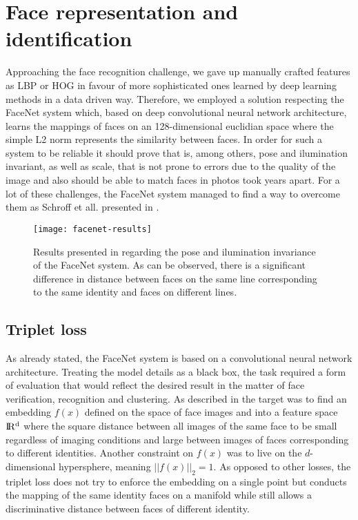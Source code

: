 \section{Face representation and identification}
Approaching the face recognition challenge, we gave up manually crafted features as LBP or HOG in favour of more sophisticated ones learned by deep learning methods in a data driven way. Therefore, we employed a solution respecting the FaceNet system which, based on  deep convolutional neural network architecture, learns the mappings of faces on an 128-dimensional euclidian space where the simple L2 norm represents the similarity between faces. In order for such a system to be reliable it should prove that is, among others, pose and ilumination invariant, as well as scale, that is not prone to errors due to the quality of the image and also should be able to match faces in photos took years apart. For a lot of these challenges, the FaceNet system managed to find a way to overcome them as Schroff et all. presented in \cite{SchroffKP15}.
\begin{figure}[h]
	\begin{center}
		\texttt{[image: facenet-results]}
		\caption[FaceNet pose and ilumination invariance from \cite{SchroffKP15}]{Results presented in \cite{SchroffKP15} regarding the pose and ilumination invariance of the FaceNet system. As can be observed, there is a significant difference in distance between faces on the same line corresponding to the same identity and faces on different lines.}
	\end{center}
\end{figure}
\subsection{Triplet loss}
As already stated, the FaceNet system is based on a convolutional neural network architecture. Treating the model details as a black box, the task required a form of evaluation that would reflect the desired result in the matter of face verification, recognition and clustering. As described in \cite{SchroffKP15} the target was to find an embedding $f(x)$ defined on the space of face images and into a feature space $\rm I\!R^{d}$ where the square distance between all images of the same face to be small regardless of imaging conditions and large between images of faces corresponding to different identities. Another constraint on $f(x)$ was to live on the $d$-dimensional hypersphere, meaning $||f(x)||_{2}=1$. As opposed to other losses, the triplet loss does not try to enforce the embedding on a single point but conducts the mapping of the same identity faces on a manifold while still allows a discriminative distance between faces of different identity. 

